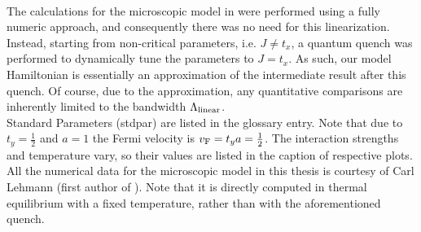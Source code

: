 \\
The calculations for the microscopic model in \cite{EP_DynamicInduced_Quenched_Lehmann_2021} were performed using a fully numeric approach, and consequently there was no need for this linearization. %
Instead, starting from non-critical parameters, i.e. $J\neq t_x$, a quantum quench was performed to dynamically tune the parameters to $J=t_x$.
As such, our model Hamiltonian is essentially an approximation of the intermediate result after this quench.
Of course, due to the approximation, any quantitative comparisons are inherently limited to the bandwidth $\Lambda_{\text{linear}}$.\\
Standard Parameters (\acrshort{stdpar}) are listed in the glossary entry.
Note that due to $t_y=\frac{1}{2}$ and $a=1$ the Fermi velocity is $v_{\text{F}} = t_ya = \frac{1}{2}$.
The interaction strengths and temperature vary, so their values are listed in the caption of respective plots.
All the numerical data for the microscopic model in this thesis is courtesy of Carl Lehmann (first author of \cite{EP_DynamicInduced_Quenched_Lehmann_2021}).
Note that it is directly computed in thermal equilibrium with a fixed temperature, rather than with the aforementioned quench.
